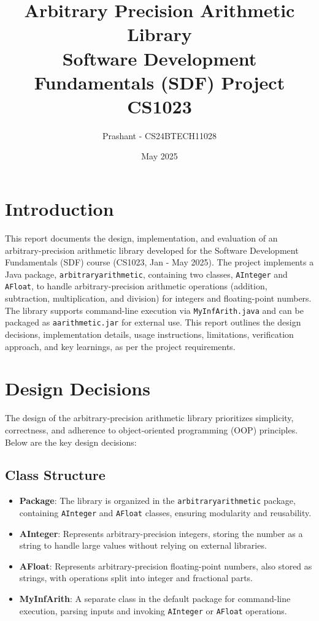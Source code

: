 \documentclass[12pt]{article}
\title{Arbitrary Precision Arithmetic Library \\ Software Development Fundamentals (SDF) Project \\ CS1023}
\author{Prashant - CS24BTECH11028}
\date{May 2025}
\begin{document}
\maketitle
\tableofcontents
\newpage

\section{Introduction}

This report documents the design, implementation, and evaluation of an arbitrary-precision arithmetic library developed for the Software Development Fundamentals (SDF) course (CS1023, Jan - May 2025). The project implements a Java package, \texttt{arbitraryarithmetic}, containing two classes, \texttt{AInteger} and \texttt{AFloat}, to handle arbitrary-precision arithmetic operations (addition, subtraction, multiplication, and division) for integers and floating-point numbers. The library supports command-line execution via \texttt{MyInfArith.java} and can be packaged as \texttt{aarithmetic.jar} for external use. This report outlines the design decisions, implementation details, usage instructions, limitations, verification approach, and key learnings, as per the project requirements.


\section{Design Decisions}
The design of the arbitrary-precision arithmetic library prioritizes simplicity, correctness, and adherence to object-oriented programming (OOP) principles. Below are the key design decisions:

\subsection{Class Structure}
\begin{itemize}
    \item \textbf{Package}: The library is organized in the \texttt{arbitraryarithmetic} package, containing \texttt{AInteger} and \texttt{AFloat} classes, ensuring modularity and reusability.
    \item \textbf{AInteger}: Represents arbitrary-precision integers, storing the number as a string to handle large values without relying on external libraries.
    \item \textbf{AFloat}: Represents arbitrary-precision floating-point numbers, also stored as strings, with operations split into integer and fractional parts.
    \item \textbf{MyInfArith}: A separate class in the default package for command-line execution, parsing inputs and invoking \texttt{AInteger} or \texttt{AFloat} operations.
\end{itemize}
\end{document}
